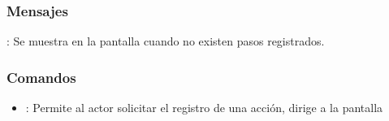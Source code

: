 \subsubsection{Mensajes}

\begin{Citemize}
	\item {}: Se muestra en la pantalla  cuando no existen pasos registrados.
\end{Citemize}

\label{IU6A.1.1.1.1.1}
\subsubsection{Comandos}
\begin{itemize}
	\item {}: Permite al actor solicitar el registro de una acción, dirige a la pantalla 
\end{itemize}